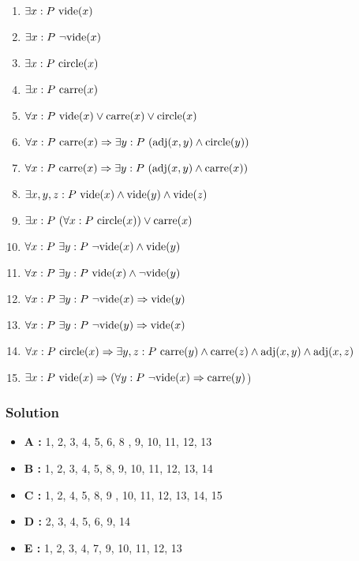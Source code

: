\begin{enumerate}
  \item $\exists x : P \ \t{vide}(x)$
  \item $\exists x : P \ \neg \text{vide}(x)$
  \item $\exists x : P \ \t{circle}(x)$
  \item $\exists x : P \ \t{carre}(x)$
  \item $\forall x : P \ \text{vide}(x) \vee \text{carre}(x) \vee \text{circle}(x)$
  \item $\forall x : P \ \text{carre}(x) \Rightarrow \exists y : P \ (\text{adj}(x, y) \land \text{circle}(y))$
  \item $\forall x : P \ \text{carre}(x) \Rightarrow \exists y : P \ (\text{adj}(x, y) \land \text{carre}(x))$
  \item $\exists x, y, z : P \ \text{vide}(x) \land \text{vide}(y) \land \text{vide}(z)$
  \item $\exists x : P \ (\forall x : P \ \t{circle}(x)) \vee \t{carre}(x)$
  \item $\forall x : P \ \exists y : P \ \neg \text{vide}(x) \land \text{vide}(y)$
  \item $\forall x : P \ \exists y : P \ \t{vide}(x) \land \neg \t{vide}(y)$
  \item $\forall x : P \ \exists y : P \ \neg \text{vide}(x) \Rightarrow \text{vide}(y)$
  \item $\forall x : P \ \exists y : P \ \neg \text{vide}(y) \Rightarrow \text{vide}(x)$
  \item $\forall x : P \ \text{circle}(x) \Rightarrow \exists y, z : P \ \text{carre}(y) \land \text{carre}(z) \land \text{adj}(x, y) \land \text{adj}(x, z)$
  \item $\exists x : P \ \text{vide}(x) \Rightarrow (\forall y : P \ \neg \text{vide}(x) \Rightarrow \text{carre}(y)$)
 \end{enumerate}

    \subsubsection{Solution}

    \begin{itemize}
        \item \textbf{A :} 1, 2, 3, 4, 5, 6, 8 , 9, 10, 11, 12, 13
        \item \textbf{B :} 1, 2, 3, 4, 5, 8, 9, 10, 11, 12, 13, 14
        \item \textbf{C :} 1, 2, 4, 5, 8, 9 , 10, 11, 12, 13, 14, 15
        \item \textbf{D :} 2, 3, 4, 5, 6, 9, 14
        \item \textbf{E :} 1, 2, 3, 4, 7, 9, 10, 11, 12, 13
    \end{itemize}

